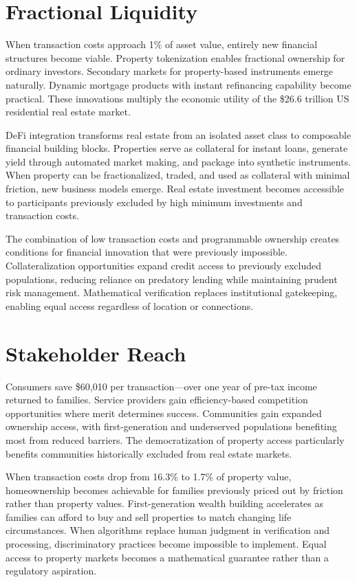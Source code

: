 \section{Fractional Liquidity}

When transaction costs approach 1\% of asset value, entirely new financial structures become viable. Property tokenization enables fractional ownership for ordinary investors. Secondary markets for property-based instruments emerge naturally. Dynamic mortgage products with instant refinancing capability become practical. These innovations multiply the economic utility of the \$26.6 trillion US residential real estate market.

DeFi integration transforms real estate from an isolated asset class to composable financial building blocks. Properties serve as collateral for instant loans, generate yield through automated market making, and package into synthetic instruments. When property can be fractionalized, traded, and used as collateral with minimal friction, new business models emerge. Real estate investment becomes accessible to participants previously excluded by high minimum investments and transaction costs.

The combination of low transaction costs and programmable ownership creates conditions for financial innovation that were previously impossible. Collateralization opportunities expand credit access to previously excluded populations, reducing reliance on predatory lending while maintaining prudent risk management. Mathematical verification replaces institutional gatekeeping, enabling equal access regardless of location or connections.

\section{Stakeholder Reach}

Consumers save \$60,010 per transaction---over one year of pre-tax income returned to families. Service providers gain efficiency-based competition opportunities where merit determines success. Communities gain expanded ownership access, with first-generation and underserved populations benefiting most from reduced barriers. The democratization of property access particularly benefits communities historically excluded from real estate markets.

When transaction costs drop from 16.3\% to 1.7\% of property value, homeownership becomes achievable for families previously priced out by friction rather than property values. First-generation wealth building accelerates as families can afford to buy and sell properties to match changing life circumstances. When algorithms replace human judgment in verification and processing, discriminatory practices become impossible to implement. Equal access to property markets becomes a mathematical guarantee rather than a regulatory aspiration.


